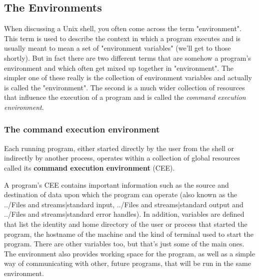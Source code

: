 \subsection{The Environments}
When discussing a Unix shell, you often come across the term "environment".
This term is used to describe the context in which a program executes and is
usually meant to mean a set of "environment variables" (we'll get to those
shortly). But in fact there are two different terms that are somehow a
program's environment and which often get mixed up together in "environment".
The simpler one of these really is the collection of environment variables and
actually is called the "environment". The second is a much wider collection of
resources that influence the execution of a program and is called the
\textit{command execution environment}.

\subsubsection{The command execution environment}
Each running program, either started directly by the user from the shell or
indirectly by another process, operates within a collection of global resources
called its \textbf{command execution environment} (CEE).

A program's CEE contains important information such as the source and
destination of data upon which the program can operate (also known as the
../Files and streams|standard input, ../Files and streams|standard output and
../Files and streams|standard error handles). In addition, variables are
defined that list the identity and home directory of the user or process that
started the program, the hostname of the machine and the kind of terminal used
to start the program. There are other variables too, but that's just some of
the main ones. The environment also provides working space for the program, as
well as a simple way of communicating with other, future programs, that will be
run in the same environment. 

